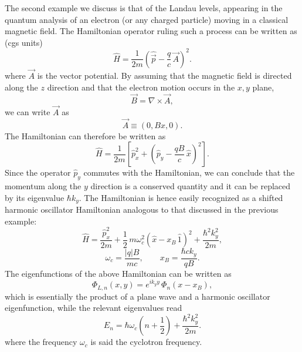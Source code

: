 The second example we discuss is that of the Landau levels,
appearing in the quantum analysis of an electron (or any charged
particle) moving in a classical magnetic field. The Hamiltonian
operator ruling such a process can be written as (cgs units)
\begin{equation}
\hat H=\frac{1}{2m}\left(\hat{\vec p}-\frac{q}{c}\,\vec A\right)^2.
\label{eq:3.5.8}
\end{equation}
where $\vec A$ is the vector potential. By assuming that the
magnetic field is directed along the $z$ direction and that the
electron motion occurs in the $x,y$ plane,
\begin{equation}
\vec B=\nabla\times\vec A,
\label{eq:3.5.9}
\end{equation}
we can write $\vec A$ as
\begin{equation}
\vec A\equiv(0,Bx,0).
\label{eq:3.5.10}
\end{equation}
The Hamiltonian can therefore be written as
\begin{equation}
\hat H=\frac{1}{2m}\left[\hat p_x^2
+\left(\hat p_y-\frac{qB}{c}\,\hat x\right)^2\right].
\label{eq:3.5.11}
\end{equation}
Since the operator $\hat p_y$ commutes with the Hamiltonian, we can
conclude that the momentum along the $y$ direction is a conserved
quantity and it can be replaced by its eigenvalue $\hbar k_y$. The
Hamiltonian is hence easily recognized as a shifted harmonic
oscillator Hamiltonian analogous to that discussed in the previous
example:
\[
\hat H=\frac{\hat p_x^2}{2m}
+\frac{1}{2}\,m\omega_c^2
\left(\hat x-x_B\,\hat 1\right)^2
+\frac{\hbar^2 k_y^2}{2m},
\]
\begin{equation}
\omega_c=\frac{|q|B}{mc},\qquad x_B=\frac{\hbar c k_y}{qB}.
\label{eq:3.5.12}
\end{equation}
The eigenfunctions of the above Hamiltonian can be written as
\begin{equation}
\Phi_{L,n}(x,y)=e^{ik_y y}\,\Phi_n(x-x_B),
\label{eq:3.5.13}
\end{equation}
which is essentially the product of a plane wave and a harmonic
oscillator eigenfunction, while the relevant eigenvalues read
\begin{equation}
E_n=\hbar\omega_c\!\left(n+\frac{1}{2}\right)
+\frac{\hbar^2 k_y^2}{2m}.
\label{eq:3.5.14}
\end{equation}
where the frequency $\omega_c$ is said the cyclotron frequency.

